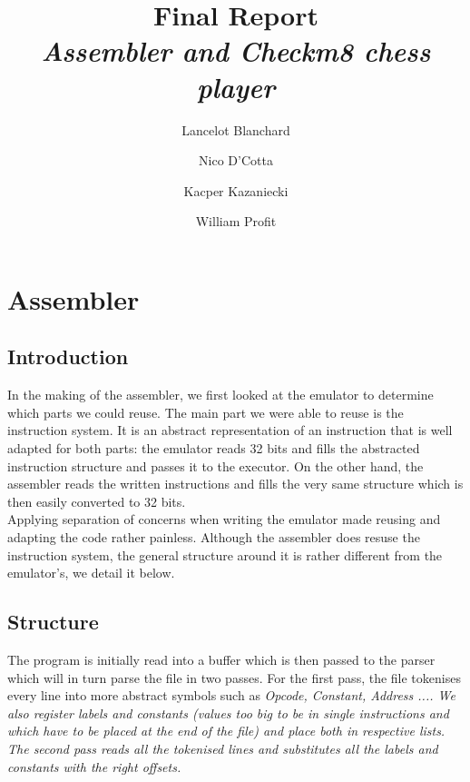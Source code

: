 \documentclass[11pt]{article}
\begin{document}
\title{Final Report\\
  \small{\em{Assembler and Checkm8 chess player}}}
\author{Lancelot Blanchard \and Nico D'Cotta \and Kacper Kazaniecki \and William Profit}

\maketitle

\section{Assembler}

\subsection{Introduction}

In the making of the assembler, we first looked at the emulator to determine
which parts we could reuse. The main part we were able to reuse is the
instruction system. It is an abstract representation of an instruction that is
well adapted for both parts: the emulator reads 32 bits and fills the abstracted
instruction structure and passes it to the executor. On the other hand, the
assembler reads the written instructions and fills the very same structure which
is then easily converted to 32 bits.\\

Applying separation of concerns when
writing the emulator made reusing and adapting the code rather painless.
Although the assembler does resuse the instruction system, the general structure
around it is rather different from the emulator's, we detail it below.\\

\subsection{Structure}

The program is initially read into a buffer which is then passed to the parser
which will in turn parse the file in two passes. For the first pass, the file
tokenises every line into more abstract symbols such as \em Opcode, Constant,
Address ...\em. We also register labels and constants (values too big to be in
single instructions and which have to be placed at the end of the file) and
place both in respective lists. The second pass reads all the tokenised lines
and substitutes all the labels and constants with the right offsets.\\
\end{document}
